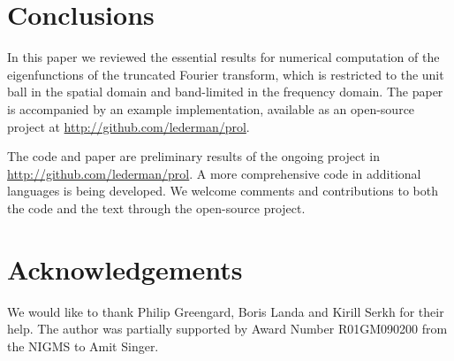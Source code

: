 \documentclass[12pt]{article}
\begin{document}
\clearpage 


\section{Conclusions}\label{sec:conclusions}

In this paper we reviewed the essential results for numerical computation of the eigenfunctions of the 
truncated Fourier transform, which is restricted to the unit ball in the spatial domain and band-limited in the frequency domain. 
The paper is accompanied by an example implementation, available as an open-source project at \url{http://github.com/lederman/prol}.

The code and paper are preliminary results of the ongoing project in \url{http://github.com/lederman/prol}. 
A more comprehensive code in additional languages is being developed. 
We welcome comments and contributions to both the code and the text through the open-source project. 


\section{Acknowledgements}

We would like to thank Philip Greengard, Boris Landa and Kirill Serkh for their help. 
The author was partially supported by Award Number R01GM090200 from the NIGMS to Amit Singer.

%
%
%
{}

\end{document}
